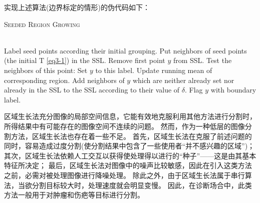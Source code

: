 实现上述算法(边界标定的情形)的伪代码如下：
{\renewcommand{\baselinestretch}{1}{
\begin{algorithm}[htb]                    %
\caption{\textsc{Seeded Region Growing}}  %
\label{alg:SRG}                           %
\begin{algorithmic}[1]   %
\ENSURE ~~\\             %

\STATE Label seed points according their initial grouping.
\STATE Put neighbors of seed points (the initial T \ref{eq3-1}) in the SSL.
    \STATE Remove first point $y$ from SSL.
    \STATE Test the neighbors of this point:
        \STATE Set $y$ to this label.
        \STATE Update running mean of corresponding region.
        \STATE Add neighbors of $y$ which are neither already set nor already in the SSL to the SSL according to their value of $\delta$.
    \ELSE
        \STATE Flag $y$ with boundary label.
    \ENDIF
\ENDWHILE

\end{algorithmic}
\end{algorithm}
}}

区域生长法充分图像的局部空间信息，它能有效地克服利用其他方法进行分割时，所得结果中有可能存在的图像空间不连续的问题。
然而，作为一种低层的图像分割方法，区域生长法也存在着一些不足。
首先，区域生长法在克服了前述问题的同时，容易造成过度分割(使分割结果中包含了一些使用者“并不感兴趣的区域”)；
其次，区域生长法依赖人工交互以获得使处理得以进行的“种子”——这是由其基本特征所决定；
最后，区域生长法对图像中的噪声比较敏感，因此在引入这类方法之前，必需对被处理图像进行降噪处理。
除此之外，由于区域生长法属于串行算法，当欲分割目标较大时，处理速度就会明显变慢。
因此，在诊断场合中，此类方法一般用于对肿瘤和伤疤等目标进行分割。

